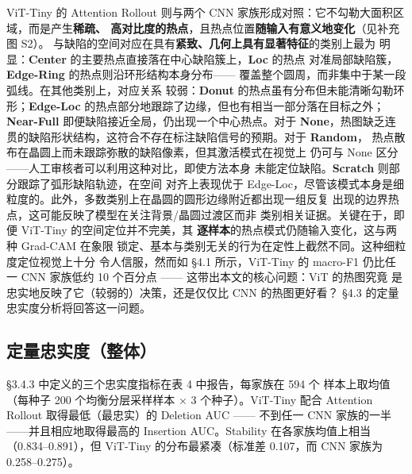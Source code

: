 \documentclass[11pt,a4paper]{article}
\begin{document}
ViT-Tiny 的 Attention Rollout 则与两个 CNN 家族形成对照：它不勾勒大面积区域，而是产生\textbf{稀疏、 高对比度的热点}，且热点位置\textbf{随输入有意义地变化}（见补充图 S2）。 与缺陷的空间对应在具有\textbf{紧致、几何上具有显著特征}的类别上最为 明显：\textbf{Center} 的主要热点直接落在中心缺陷簇上，\textbf{Loc} 的热点 对准局部缺陷簇，\textbf{Edge-Ring} 的热点则沿环形结构本身分布—— 覆盖整个圆周，而非集中于某一段弧线。在其他类别上，对应关系 较弱：\textbf{Donut} 的热点虽有分布但未能清晰勾勒环形；\textbf{Edge-Loc} 的热点部分地跟踪了边缘，但也有相当一部分落在目标之外； \textbf{Near-Full} 即便缺陷接近全局，仍出现一个中心热点。对于 \textbf{None}，热图缺乏连贯的缺陷形状结构，这符合不存在标注缺陷信号的预期。对于 \textbf{Random}， 热点散布在晶圆上而未跟踪弥散的缺陷像素，但其激活模式在视觉上 仍可与 None 区分——人工审核者可以利用这种对比，即使方法本身 未能定位缺陷。\textbf{Scratch} 则部分跟踪了弧形缺陷轨迹，在空间 对齐上表现优于 Edge-Loc，尽管该模式本身是细粒度的。此外，多数类别上在晶圆的圆形边缘附近都出现一组反复 出现的边界热点，这可能反映了模型在关注背景/晶圆过渡区而非 类别相关证据。关键在于，即便 ViT-Tiny 的空间定位并不完美，其 \textbf{逐样本}的热点模式仍随输入变化，这与两种 Grad-CAM 在象限 锁定、基本与类别无关的行为在定性上截然不同。这种细粒度定位视觉上十分 令人信服，然而如 §4.1 所示，ViT-Tiny 的 macro-F1 仍比任一 CNN 家族低约 10 个百分点 —— 这带出本文的核心问题：ViT 的热图究竟 是忠实地反映了它（较弱的）决策，还是仅仅比 CNN 的热图更好看？ §4.3
的定量忠实度分析将回答这一问题。


\subsection{定量忠实度（整体）}

§3.4.3 中定义的三个忠实度指标在表 4 中报告，每家族在 594 个 样本上取均值（每种子 200 个均衡分层采样样本 × 3 个种子）。ViT-Tiny 配合 Attention Rollout 取得最低（最忠实）的 Deletion AUC —— 不到任一 CNN 家族的一半——并且相应地取得最高的 Insertion AUC。Stability 在各家族均值上相当（0.834–0.891），但 ViT-Tiny 的分布最紧凑（标准差 0.107，而 CNN 家族为 0.258–0.275）。

\begin{table}[htbp]
\centering
\small
\caption{\textbf{表 4.} 定量忠实度指标（均值 ± 标准差，n=594）}
\end{table}
\end{document}
